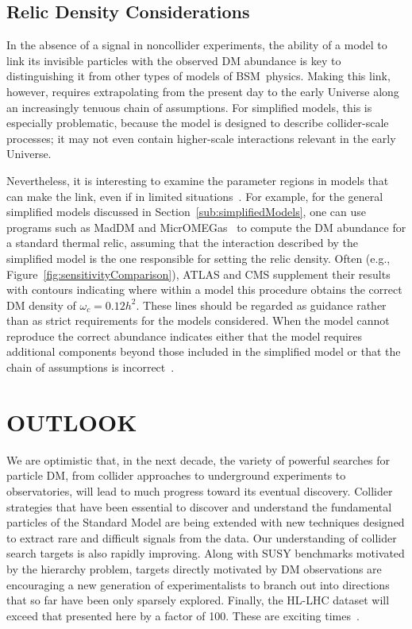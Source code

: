 \documentclass{ar-1col}
\newcommand{\IP}{invisible particle}
\begin{document}
\subsection{Relic Density Considerations}

In the absence of a signal in noncollider experiments, the ability of a
model to link its {\IP}s with the observed DM abundance is key to
distinguishing it from other types of models of BSM\ physics. Making this link, however, requires extrapolating
from the present day to the early Universe along an increasingly
tenuous chain of assumptions. For simplified models, this is
especially problematic, because the model is designed to describe
collider-scale processes; it may not even contain higher-scale interactions
relevant in the early Universe. 

Nevertheless, it is interesting to
examine the parameter regions in models that can make the link, even if in limited
situations~\cite{Busoni:2014gta,Catena:2017xqq}. For example, for
the general simplified models discussed in
Section~\ref{sub:simplifiedModels}, one can use programs
such as MadDM and
MicrOMEGas~\cite{Backovic:2015cra,Barducci:2016pcb} to compute  the DM
abundance for a standard thermal relic, assuming that the
interaction described by the simplified model is the one
responsible for setting the relic density. Often (e.g.,
Figure~\ref{fig:sensitivityComparison}), ATLAS and CMS supplement
their results with contours indicating where within a model this
procedure obtains the correct DM density of $\omega_c =
0.12 h^2$. These lines should be regarded as guidance rather than as strict
requirements for the models considered. 
When the model cannot reproduce the correct abundance indicates either that  the model requires additional
components beyond those included in the simplified model or that
the chain of assumptions is incorrect~\cite{Bernal:2017kxu}.

\section{OUTLOOK}\label{sec:05_Future}

We are optimistic that, in the next decade, the variety of powerful searches for
particle DM, from collider approaches to underground
experiments to observatories, will lead to much progress toward its eventual discovery.
Collider strategies that have been essential to discover and understand the fundamental particles
of the Standard Model are being extended with new techniques designed to extract rare and difficult
signals from the data. Our understanding of
collider search targets is also rapidly improving. Along with SUSY
benchmarks motivated by the hierarchy problem, targets directly
motivated by DM observations are encouraging a new generation of
experimentalists to branch out into directions that so far have been only
sparsely explored. Finally, the HL-LHC dataset will exceed that presented here by a factor of 100. These
are exciting times~\cite{Steigman:1979kw}.
\end{document}
